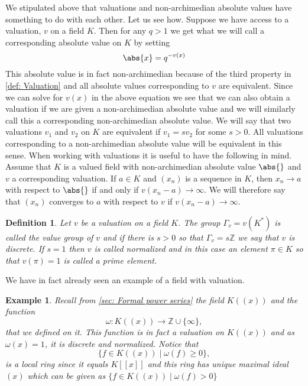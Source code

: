 \documentclass{article}
\newtheorem{definition}{Definition}[section]
\newtheorem{example}{Example}[section]
\newcommand{\mbb}[1]{\mathbb{#1}}
\numberwithin{equation}{section}
\begin{document}
We stipulated above that valuations and non-archimedian absolute values have something to do with each other. Let us see how. Suppose we have access to a valuation, $v$ on a field $K$. Then for any $q > 1$ we get what we will call a corresponding absolute value on $K$ by setting 
$$\abs{x} = q^{-v(x)}$$ 
This absolute value is in fact non-archimedian because of the third property in \cref{def: Valuation} and all absolute values corresponding to $v$ are equivalent. Since we can solve for $v(x)$ in the above equation we see that we can also obtain a valuation if we are given a non-archimedian absolute value and we will similarly call this a corresponding non-archimedian absolute value. We will say that two valuations $v_1$ and $v_2$ on $K$ are equivalent if $v_1 = sv_2$ for some $s > 0$. All valuations corresponding to a non-archimedian absolute value will be equivalent in this sense. When working with valuations it is useful to have the following in mind. Assume that $K$ is a valued field with non-archimedian absolute value $\abs{}$ and $v$ a corresponding valuation. If $a \in K$ and $(x_n)$ is a sequence in $K$, then $x_n \to a$ with respect to $\abs{}$ if and only if $v(x_n - a) \to \infty$. We will therefore say that $(x_n)$ converges to $a$ with respect to $v$ if $v(x_n - a) \to \infty$. 

\begin{definition}
    Let $v$ be a valuation on a field $K$. The group $\Gamma_v = v(K^*)$ is called the value group of $v$ and if there is $s > 0$ so that $\Gamma_v = s\mbb Z$ we say that $v$ is discrete. If $s = 1$ then $v$ is called normalized and in this case an element $\pi \in K$ so that $v(\pi) = 1$ is called a prime element.
   
\end{definition}

We have in fact already seen an example of a field with valuation.
\begin{example}\label{ex: K((x)) is valued field}
    Recall from \cref{sec: Formal power series} the field $K((x))$ and the function $$\omega : K((x)) \to \mbb Z \cup \{ \infty \},$$ that we defined on it. This function is in fact a valuation on $K((x))$ and as $\omega(x) = 1$,
    it is discrete and normalized. Notice that
    $$\{f \in K((x)) \mid \omega(f) \geq 0 \},$$
    is a local ring since it equals $K[[x]]$ and this ring has unique maximal ideal $(x)$ which can be given as
    $\{ f \in K((x)) \mid \omega(f) > 0\}$ 
\end{example}
\end{document}
